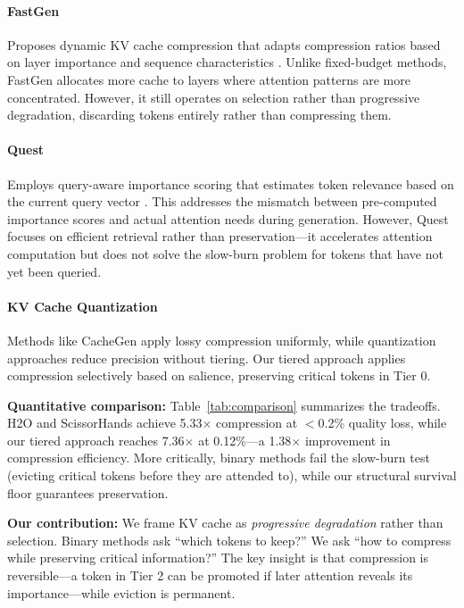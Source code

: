 \documentclass[11pt]{article}
\begin{document}
\paragraph{FastGen} Proposes dynamic KV cache compression that adapts compression ratios based on layer importance and sequence characteristics \cite{fastgen}. Unlike fixed-budget methods, FastGen allocates more cache to layers where attention patterns are more concentrated. However, it still operates on selection rather than progressive degradation, discarding tokens entirely rather than compressing them.

\paragraph{Quest} Employs query-aware importance scoring that estimates token relevance based on the current query vector \cite{quest}. This addresses the mismatch between pre-computed importance scores and actual attention needs during generation. However, Quest focuses on efficient retrieval rather than preservation---it accelerates attention computation but does not solve the slow-burn problem for tokens that have not yet been queried.

\paragraph{KV Cache Quantization} Methods like CacheGen \cite{cachegen} apply lossy compression uniformly, while quantization approaches \cite{kivi} reduce precision without tiering. Our tiered approach applies compression selectively based on salience, preserving critical tokens in Tier 0.

\textbf{Quantitative comparison:} Table~\ref{tab:comparison} summarizes the tradeoffs. H2O and ScissorHands achieve 5.33$\times$ compression at $<$0.2\% quality loss, while our tiered approach reaches 7.36$\times$ at 0.12\%---a 1.38$\times$ improvement in compression efficiency. More critically, binary methods fail the slow-burn test (evicting critical tokens before they are attended to), while our structural survival floor guarantees preservation.

\textbf{Our contribution:} We frame KV cache as \textit{progressive degradation} rather than selection. Binary methods ask ``which tokens to keep?'' We ask ``how to compress while preserving critical information?'' The key insight is that compression is reversible---a token in Tier 2 can be promoted if later attention reveals its importance---while eviction is permanent.
\end{document}
